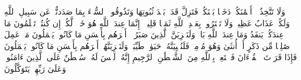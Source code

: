 \stopbuffer
\startbuffer[\q:16:94]
وَلَا تَتَّخِذُوۤا۟ أَیۡمَٰنَكُمۡ دَخَلَۢا بَیۡنَكُمۡ فَتَزِلَّ قَدَمُۢ بَعۡدَ ثُبُوتِهَا وَتَذُوقُوا۟ ٱلسُّوۤءَ بِمَا صَدَدتُّمۡ عَن سَبِیلِ ٱللَّهِ وَلَكُمۡ عَذَابٌ عَظِیمࣱ%
\stopbuffer
\startbuffer[\q:16:95]
وَلَا تَشۡتَرُوا۟ بِعَهۡدِ ٱللَّهِ ثَمَنࣰا قَلِیلًاۚ إِنَّمَا عِندَ ٱللَّهِ هُوَ خَیۡرࣱ لَّكُمۡ إِن كُنتُمۡ تَعۡلَمُونَ%
\stopbuffer
\startbuffer[\q:16:96]
مَا عِندَكُمۡ یَنفَدُ وَمَا عِندَ ٱللَّهِ بَاقࣲۗ وَلَنَجۡزِیَنَّ ٱلَّذِینَ صَبَرُوۤا۟ أَجۡرَهُم بِأَحۡسَنِ مَا كَانُوا۟ یَعۡمَلُونَ%
\stopbuffer
\startbuffer[\q:16:97]
مَنۡ عَمِلَ صَٰلِحࣰا مِّن ذَكَرٍ أَوۡ أُنثَىٰ وَهُوَ مُؤۡمِنࣱ فَلَنُحۡیِیَنَّهُۥ حَیَوٰةࣰ طَیِّبَةࣰۖ وَلَنَجۡزِیَنَّهُمۡ أَجۡرَهُم بِأَحۡسَنِ مَا كَانُوا۟ یَعۡمَلُونَ%
\stopbuffer
\startbuffer[\q:16:98]
فَإِذَا قَرَأۡتَ ٱلۡقُرۡءَانَ فَٱسۡتَعِذۡ بِٱللَّهِ مِنَ ٱلشَّیۡطَٰنِ ٱلرَّجِیمِ%
\stopbuffer
\startbuffer[\q:16:99]
إِنَّهُۥ لَیۡسَ لَهُۥ سُلۡطَٰنٌ عَلَى ٱلَّذِینَ ءَامَنُوا۟ وَعَلَىٰ رَبِّهِمۡ یَتَوَكَّلُونَ%
\stopbuffer
